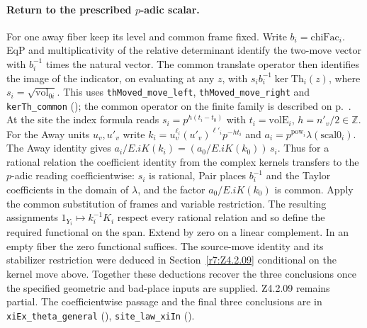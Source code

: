 \paragraph{Return to the prescribed \(p\)-adic scalar.}
For one away fiber keep its level and common frame fixed. Write
\(b_i=\mathrm{chiFac}_i\). EqP and multiplicativity of the relative
determinant identify the two-move vector with
\(b_i^{-1}\) times the natural vector. The common translate operator
then identifies the image of the indicator, on evaluating at any
\(z\), with \(s_i b_i^{-1}\ker\mathrm{Th}_i(z)\), where
\(s_i=\sqrt{\mathrm{vol}_{0i}}\).
This uses \nolinkurl{thMoved_move_left}, \nolinkurl{thMoved_move_right}
and \nolinkurl{kerTh_common}
();
the common operator on the finite family is described on
p.~\pageref{r7:Z4.2.09}. At the site the index formula reads
\(s_i=p^{h(t_i-t_0)}\) with \(t_i=\mathrm{volE}_i\),
\(h=n'_v/2\in\mathbb Z\).
For the Away units \(u_v,u'_v\) write
\(k_i=u_v^{\ell_i}(u'_v)^{\ell'_i}p^{-h t_i}\) and
\(a_i=p^{\mathrm{pow}_i}\lambda(\mathrm{scal0}_i)\).
The Away identity gives
\(a_i/E.iK(k_i)=(a_0/E.iK(k_0))\,s_i\).
Thus for a rational relation the coefficient identity from the
complex kernels transfers to the \(p\)-adic reading coefficientwise:
\(s_i\) is rational, Pair places \(b_i^{-1}\) and the Taylor
coefficients in the domain of \(\lambda\), and the factor
\(a_0/E.iK(k_0)\) is common. Apply the common substitution of frames
and variable restriction. The resulting assignments
\(1_{Y_i}\mapsto k_i^{-1}K_i\) respect every rational relation and
so define the required functional on the span. Extend by zero on a
linear complement. In an empty fiber the zero functional suffices.
The source-move identity and its stabilizer restriction were deduced in
Section~\ref{r7:Z4.2.09} conditional on the kernel move above. Together
these deductions recover the three conclusions once the specified
geometric and bad-place inputs are supplied. Z4.2.09 remains partial.
The coefficientwise passage and the final three conclusions are in
\nolinkurl{xiEx_theta_general}
(),
\nolinkurl{site_law_xiIn}
().

